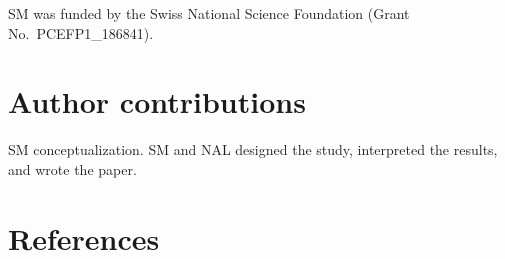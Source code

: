 \documentclass[
]{article}
\begin{document}
SM was funded by the Swiss National Science Foundation (Grant
No.~PCEFP1\_186841).

\hypertarget{author-contributions}{%
\section{Author contributions}\label{author-contributions}}

SM conceptualization. SM and NAL designed the study, interpreted the
results, and wrote the paper.

\hypertarget{references}{%
\section*{References}\label{references}}
\end{document}
